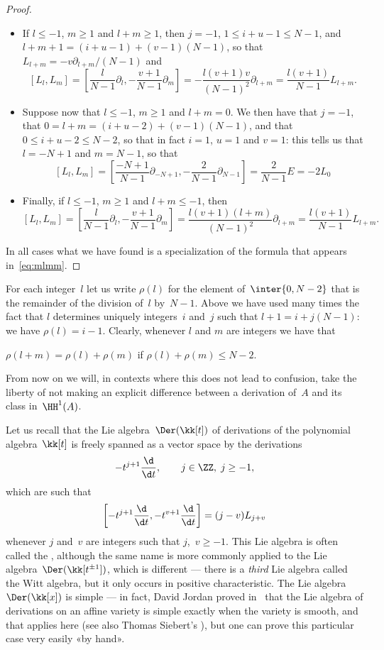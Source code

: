 \begin{proof}
\begin{itemize}
\item If $l\leq-1$, $m\geq1$ and $l+m\geq1$, then
$j=-1$, $1\leq i+u-1\leq N-1$, and $l+m+1=(i+u-1)+(v-1)(N-1)$, so that
$L_{l+m}=-v\partial_{l+m}/(N-1)$ and
  \[
  [L_l,L_m]
        = \left[\frac{l}{N-1}\partial_l,-\frac{v+1}{N-1}\partial_m\right]
        = -\frac{l(v+1)v}{(N-1)^2}\partial_{l+m}
        = \frac{l(v+1)}{N-1}L_{l+m}.
  \]

\item Suppose now that $l\leq-1$, $m\geq1$ and $l+m=0$. We then have that
$j=-1$, that $0=l+m=(i+u-2)+(v-1)(N-1)$, and that $0\leq i+u-2\leq N-2$, so
that in fact $i=1$, $u=1$ and $v=1$: this tells us that $l=-N+1$ and
$m=N-1$, so that
  \[
  [L_l,L_m]
        = \left[
                \frac{-N+1}{N-1}\partial_{-N+1},
                -\frac{2}{N-1}\partial_{N-1}
          \right]
        = \frac{2}{N-1} E
        = -2L_0
  \]

\item Finally, if $l\leq-1$, $m\geq1$ and $l+m\leq-1$, then
  \[
  [L_l,L_m]
        = \left[
                \frac{l}{N-1}\partial_{l},
                -\frac{v+1}{N-1}\partial_{m}
          \right]
        = \frac{l(v+1)(l+m)}{(N-1)^2}\partial_{l+m}
        = \frac{l(v+1)}{N-1}L_{l+m}.
  \]

\end{itemize}
In all cases what we have found is a specialization of the formula that
appears in~\eqref{eq:mlmm}.
\end{proof}

For each integer~$l$ let us write $\rho(l)$ for the element
of~$\inter{0,N-2}$ that is the remainder of the division of~$l$ by~$N-1$.
Above we have used many times the fact that $l$ determines uniquely
integers~$i$ and~$j$ such that $l+1=i+j(N-1)$: we have $\rho(l)=i-1$.
Clearly, whenever $l$ and $m$ are integers we have that
\begin{claim}
  $\rho(l+m)=\rho(l)+\rho(m)$ if $\rho(l)+\rho(m)\leq N-2$.
\end{claim}
From now on we will, in contexts where this does not lead to confusion,
take the liberty of not making an explicit difference between a derivation
of~$A$ and its class in~$\HH^1(A)$.

Let us recall that the Lie algebra~$\Der(\kk[t])$ of derivations of the
polynomial algebra~$\kk[t]$ is freely spanned as a vector space by the
derivations
  \[
  - t^{j+1}\frac{\d}{\d t}, \qquad j\in\ZZ,\; j\geq-1,
  \]
which are such that
  \[ \label{eq:witt}
  \left[- t^{j+1}\frac{\d}{\d t}, - t^{v+1}\frac{\d}{\d t}\right] 
        = (j-v)L_{j+v}
  \]
whenever $j$ and~$v$ are integers such that $j$,~$v\geq-1$. This Lie
algebra is often called the , although the same name
is more commonly applied to the Lie algebra~$\Der(\kk[t^{\pm1}])$, which is
different --- there is a \emph{third} Lie algebra called the Witt algebra,
but it only occurs in positive characteristic. The Lie algebra
$\Der(\kk[x])$ is simple --- in fact, David Jordan proved in~\cite{Jordan}
that the Lie algebra of derivations on an affine variety is simple exactly
when the variety is smooth, and that applies here (see also Thomas
Siebert's \cite{Siebert}), but one can prove this particular case very
easily «by hand».

